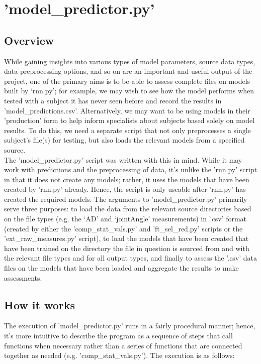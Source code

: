 \documentclass[12pt,twoside]{report}
\begin{document}
\section{'model\_predictor.py'}

\subsection{Overview}

\quad While gaining insights into various types of model parameters, source data types, data preprocessing options, and so on are an important and useful output of the project, one of the primary aims is to be able to assess complete files on models built by ‘rnn.py’; for example, we may wish to see how the model performs when tested with a subject it has never seen before and record the results in 'model\_predictions.csv'. Alternatively, we may want to be using models in their 'production' form to help inform specialists about subjects based solely on model results. To do this, we need a separate script that not only preprocesses a single subject's file(s) for testing, but also loads the relevant models from a specified source.\\

\quad The 'model\_predictor.py' script was written with this in mind. While it may work with predictions and the preprocessing of data, it's unlike the 'rnn.py' script in that it does not create any models; rather, it uses the models that have been created by 'rnn.py' already. Hence, the script is only useable after 'rnn.py' has created the required models. The arguments to 'model\_predictor.py' primarily serve three purposes: to load the data from the relevant source directories based on the file types (e.g. the ‘AD’ and ‘jointAngle’ measurements) in '.csv' format (created by either the 'comp\_stat\_vals.py' and 'ft\_sel\_red.py' scripts or the 'ext\_raw\_measures.py' script), to load the models that have been created that have been trained on the directory the file in question is sourced from and with the relevant file types and for all output types, and finally to assess the '.csv' data files on the models that have been loaded and aggregate the results to make assessments.


\subsection{How it works}

\quad The execution of 'model\_predictor.py' runs in a fairly procedural manner; hence, it's more intuitive to describe the program as a sequence of steps that call functions when necessary rather than a series of functions that are connected together as needed (e.g. 'comp\_stat\_vals.py'). The execution is as follows:
\end{document}
